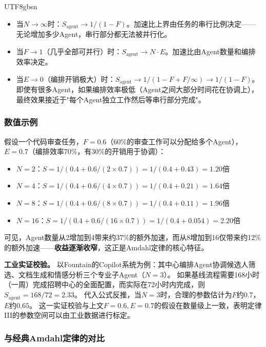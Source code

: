 \documentclass[11pt,a4paper]{article}
\begin{document}
\begin{CJK*}{UTF8}{gbsn}
\begin{itemize}[nosep]
\item 当$N \to \infty$时：$S_{\mathrm{agent}} \to 1/(1-F)$。加速比上界由任务的串行比例决定——无论增加多少Agent，串行部分都无法被并行化。
\item 当$F \to 1$（几乎全部可并行）时：$S_{\mathrm{agent}} \to N \cdot E$。加速比由Agent数量和编排效率决定。
\item 当$E \to 0$（编排开销极大）时：$S_{\mathrm{agent}} \to 1/(1-F+F/\infty) \to 1/(1-F)$。即使有很多Agent，如果编排效率极低（Agent之间大部分时间花在协调上），最终效果接近于"每个Agent独立工作然后等串行部分完成"。
\end{itemize}

\subsubsection{数值示例}

假设一个代码审查任务，$F = 0.6$（60\%的审查工作可以分配给多个Agent），$E = 0.7$（编排效率70\%，有30\%的开销用于协调）：

\begin{itemize}[nosep]
\item $N = 2$：$S = 1/(0.4 + 0.6/(2 \times 0.7)) = 1/(0.4 + 0.43) = 1.20$倍
\item $N = 4$：$S = 1/(0.4 + 0.6/(4 \times 0.7)) = 1/(0.4 + 0.21) = 1.64$倍
\item $N = 8$：$S = 1/(0.4 + 0.6/(8 \times 0.7)) = 1/(0.4 + 0.11) = 1.96$倍
\item $N = 16$：$S = 1/(0.4 + 0.6/(16 \times 0.7)) = 1/(0.4 + 0.054) = 2.20$倍
\end{itemize}

可见，Agent数量从2增加到4带来约37\%的额外加速，而从8增加到16仅带来约12\%的额外加速——\textbf{收益逐渐收窄}，这正是Amdahl定律的核心特征。

\textbf{工业实证校验。}
以Fountain的Copilot系统为例\cite{anthropic2026agenticreport}：其中心编排Agent协调候选人筛选、文档生成和情感分析三个专业子Agent（$N=3$）。
如果基线流程需要168小时（一周）完成招聘中心的全面配置，而实际在72小时内完成，则$S_{\mathrm{agent}} = 168/72 = 2.33$。
代入公式反推，当$N=3$时，合理的参数估计为$F$约$0.7$，$E$约$0.65$。
这一实证校验与上文$F=0.6, E=0.7$的假设在数量级上一致，表明定律III的参数空间可以由工业数据进行标定。

\subsubsection{与经典Amdahl定律的对比}


\end{CJK*}
\end{document}
